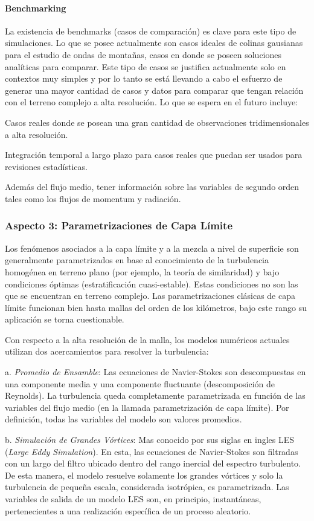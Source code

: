 \paragraph{Benchmarking} La existencia de benchmarks (casos de comparación) es clave para este tipo de simulaciones. Lo que se posee actualmente son casos ideales de colinas gausianas para el estudio de ondas de montañas, casos en donde se poseen soluciones analíticas para comparar. Este tipo de casos se justifica actualmente solo en contextos muy simples y por lo tanto se está llevando a cabo el esfuerzo de generar una mayor cantidad de casos y datos para comparar que tengan relación con el terreno complejo a alta resolución. Lo que se espera en el futuro incluye:
\begin{itemize*}
	\item Casos reales donde se posean una gran cantidad de observaciones tridimensionales a alta resolución.
	\item Integración temporal a largo plazo para casos reales que puedan ser usados para revisiones estadísticas.
	\item Además del flujo medio, tener información sobre las variables de segundo orden tales como los flujos de momentum y radiación.
\end{itemize*} 
\subsubsection{Aspecto 3: Parametrizaciones de Capa Límite}
Los fenómenos asociados a la capa límite y a la mezcla a nivel de superficie son generalmente parametrizados en base al conocimiento de la turbulencia homogénea en terreno plano (por ejemplo, la teoría de similaridad) y bajo condiciones óptimas (estratificación cuasi-estable). Estas condiciones no son las que se encuentran en terreno complejo. Las parametrizaciones clásicas de capa límite funcionan bien hasta mallas del orden de los kilómetros, bajo este rango su aplicación se torna cuestionable.

Con respecto a la alta resolución de la malla, los modelos numéricos actuales utilizan dos acercamientos para resolver la turbulencia:
\begin{enumerate*}
	\item[a.] \emph{Promedio de Ensamble}: Las ecuaciones de Navier-Stokes son descompuestas en una componente media y una componente fluctuante (descomposición de Reynolds). La turbulencia queda completamente parametrizada en función de las variables del flujo medio (en la llamada parametrización de capa límite). Por definición, todas las variables del modelo son valores promedios.
	\item[b.] \emph{Simulación de Grandes Vórtices}: Mas conocido por sus siglas en ingles LES (\emph{Large Eddy Simulation}). En esta, las ecuaciones de Navier-Stokes son filtradas con un largo del filtro ubicado dentro del rango inercial del espectro turbulento. De esta manera, el modelo resuelve solamente los grandes vórtices y solo la turbulencia de pequeña escala, considerada isotrópica, es parametrizada. Las variables de salida de un modelo LES son, en principio, instantáneas, pertenecientes a una realización específica de un proceso aleatorio.
\end{enumerate*} 

